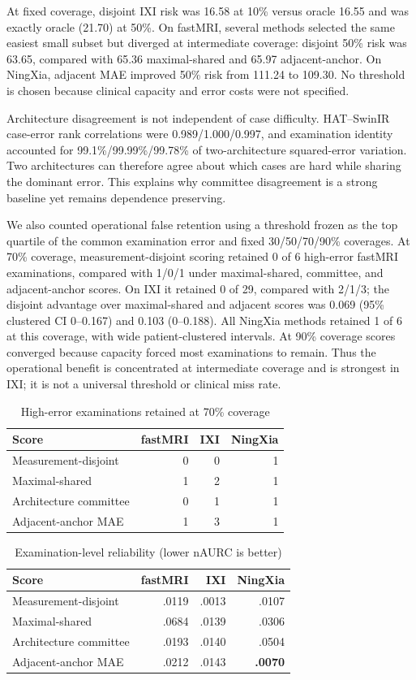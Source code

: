 \documentclass[journal,10pt]{IEEEtran}
\begin{document}
At fixed coverage, disjoint IXI risk was 16.58 at 10\% versus oracle 16.55 and was exactly oracle (21.70) at 50\%. On fastMRI, several methods selected the same easiest small subset but diverged at intermediate coverage: disjoint 50\% risk was 63.65, compared with 65.36 maximal-shared and 65.97 adjacent-anchor. On NingXia, adjacent MAE improved 50\% risk from 111.24 to 109.30. No threshold is chosen because clinical capacity and error costs were not specified.

Architecture disagreement is not independent of case difficulty. HAT--SwinIR case-error rank correlations were 0.989/1.000/0.997, and examination identity accounted for 99.1\%/99.99\%/99.78\% of two-architecture squared-error variation. Two architectures can therefore agree about which cases are hard while sharing the dominant error. This explains why committee disagreement is a strong baseline yet remains dependence preserving.

We also counted operational false retention using a threshold frozen as the top quartile of the common examination error and fixed 30/50/70/90\% coverages. At 70\% coverage, measurement-disjoint scoring retained 0 of 6 high-error fastMRI examinations, compared with 1/0/1 under maximal-shared, committee, and adjacent-anchor scores. On IXI it retained 0 of 29, compared with 2/1/3; the disjoint advantage over maximal-shared and adjacent scores was 0.069 (95\% clustered CI 0--0.167) and 0.103 (0--0.188). All NingXia methods retained 1 of 6 at this coverage, with wide patient-clustered intervals. At 90\% coverage scores converged because capacity forced most examinations to remain. Thus the operational benefit is concentrated at intermediate coverage and is strongest in IXI; it is not a universal threshold or clinical miss rate.

\begin{table}[t]
\caption{High-error examinations retained at 70\% coverage}
\label{tab:false-retention}\centering
\begin{tabular}{lrrr}
\toprule
Score&fastMRI&IXI&NingXia\\
\midrule
Measurement-disjoint&0&0&1\\
Maximal-shared&1&2&1\\
Architecture committee&0&1&1\\
Adjacent-anchor MAE&1&3&1\\
\bottomrule
\end{tabular}
\end{table}

\begin{table}[t]
\caption{Examination-level reliability (lower nAURC is better)}
\label{tab:risk}\centering
\begin{tabular}{lrrr}
\toprule
Score&fastMRI&IXI&NingXia\\
\midrule
Measurement-disjoint&.0119&.0013&.0107\\
Maximal-shared&.0684&.0139&.0306\\
Architecture committee&.0193&.0140&.0504\\
Adjacent-anchor MAE&.0212&.0143&\textbf{.0070}\\
\bottomrule
\end{tabular}
\end{table}
\end{document}

